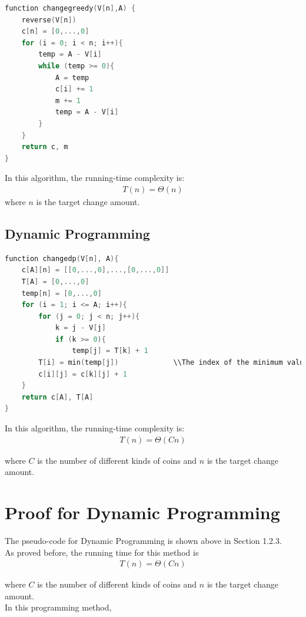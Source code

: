 \documentclass[11pt]{scrreprt}
\begin{document}
\begin{lstlisting}[language=c]
function changegreedy(V[n],A) {
	reverse(V[n])
	c[n] = [0,...,0]
	for (i = 0; i < n; i++){
		temp = A - V[i]
		while (temp >= 0){
		    A = temp
		    c[i] += 1
		    m += 1
		    temp = A - V[i]
		}
	}
	return c, m
}
\end{lstlisting}

In this algorithm, the running-time complexity is:
\begin{eqnarray*}
T(n) = \Theta(n)
\end{eqnarray*}
 where $n$ is the target change amount.
\subsection{Dynamic Programming}

\begin{lstlisting}[language=c]
function changedp(V[n], A){
	c[A][n] = [[0,...,0],...,[0,...,0]]
	T[A] = [0,...,0]
	temp[n] = [0,...,0]
	for (i = 1; i <= A; i++){
		for (j = 0; j < n; j++){
			k = j - V[j]
			if (k >= 0){
				temp[j] = T[k] + 1
		T[i] = min(temp[j])				\\The index of the minimum value of array temp is j.
		c[i][j] = c[k][j] + 1
	}
	return c[A], T[A]
}
\end{lstlisting}

In this algorithm, the running-time complexity is:
\begin{eqnarray*}
T(n) = \Theta(Cn)
\end{eqnarray*}

where $C$ is the number of different kinds of coins and $n$ is the target change amount.


\section{Proof for Dynamic Programming}


The pseudo-code for Dynamic Programming is shown above in Section 1.2.3.\\

As proved before, the running time for this method is
\begin{eqnarray*}
T(n)  =  \Theta(Cn)
\end{eqnarray*}

where $C$ is the number of different kinds of coins and $n$ is the target change amount.\\

In this programming method,\\
\end{document}
